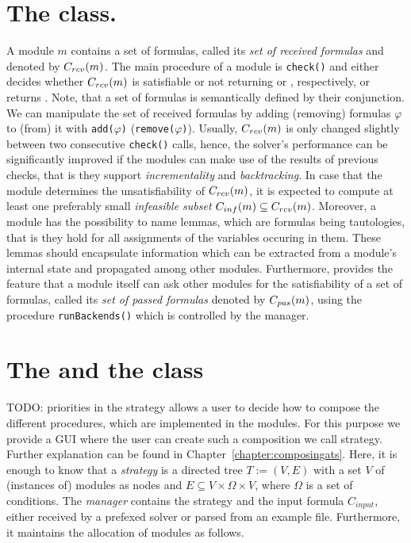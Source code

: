 \section{The \moduleClass class.} A module $m$ contains a set of
formulas, called its \emph{set of received formulas} and denoted by 
$C_{rcv}(m)$. The main
procedure of a module  is \texttt{check()} and either decides
whether $C_{rcv}(m)$ is satisfiable or not returning \SAT or \UNSAT,
respectively, or returns \UNKNOWN. Note, that a set of formulas is
semantically defined by their conjunction. We can manipulate the set
of received formulas by adding (removing) formulas $\varphi$ to (from)
it with \texttt{add($\varphi$)} (\texttt{remove($\varphi$)}). Usually, 
$C_{rcv}(m)$ is only changed slightly between two consecutive 
\texttt{check()} calls, hence, the solver's performance can be significantly improved if the modules can
make use of the results of previous checks, that is they support
\emph{incrementality} and \emph{backtracking}. In case that the module
determines the unsatisfiability of $C_{rcv}(m)$, it is expected to compute
at least one preferably small \emph{infeasible subset} $C_{inf}(m)\subseteq
C_{rcv}(m)$. Moreover, a module has the possibility to name lemmas, which
are formulas being tautologies, that is they hold for all assignments
of the variables occuring in them. These lemmas should encapsulate
information which can be extracted from a module's internal state and
propagated among other \smtrat modules. Furthermore, \smtrat provides
the feature that a module itself can ask other modules for the
satisfiability of a set of formulas, called its \emph{set
of passed formulas} denoted by $C_{pas}(m)$, using the procedure \texttt{runBackends()} which
is controlled by the manager. 

\section{The \managerClass and the \strategyClass class} 
\label{sec:managerstrategy}
TODO: priorities in the strategy\newline 
\smtrat allows a user to decide how to compose the different procedures,
which are implemented in the modules. For this purpose we provide a GUI
where the user can create such a composition we call strategy. Further
explanation can be found in Chapter~\ref{chapter:composingats}. Here, 
it is enough to know that a \emph{strategy} is a directed tree $T:=(V, E)$ with a set $V$ of
(instances of) modules as nodes and $E\subseteq V\times \Omega\times V$,
where $\Omega$ is a set of conditions. The \emph{manager} contains the
strategy and the input formula $C_{input}$, either received by a prefexed solver
or parsed from an example file. Furthermore, it maintains the
allocation of modules as follows. 

